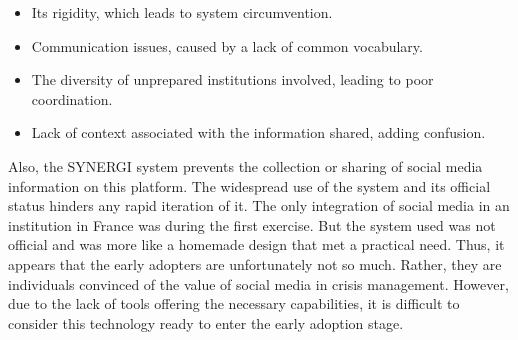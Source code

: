 \begin{itemize}
    \item Its rigidity, which leads to system circumvention.
    \item Communication issues, caused by a lack of common vocabulary.
    \item The diversity of unprepared institutions involved, leading to poor coordination.
    \item Lack of context associated with the information shared, adding confusion.
\end{itemize}

Also, the SYNERGI system prevents the collection or sharing of social media information on this platform.
The widespread use of the system and its official status hinders any rapid iteration of it.
The only integration of social media in an institution in France was during the first exercise.
But the system used was not official and was more like a homemade design that met a practical need.
Thus, it appears that the early adopters are unfortunately not so much.
Rather, they are individuals convinced of the value of social media in crisis management.
However, due to the lack of tools offering the necessary capabilities, it is difficult to consider this technology ready to enter the early adoption stage.

